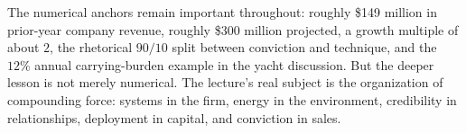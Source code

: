 The numerical anchors remain important throughout: roughly \$149 million in prior-year company revenue, roughly \$300 million projected, a growth multiple of about \(2\), the rhetorical \(90/10\) split between conviction and technique, and the \(12\%\) annual carrying-burden example in the yacht discussion. But the deeper lesson is not merely numerical. The lecture's real subject is the organization of compounding force: systems in the firm, energy in the environment, credibility in relationships, deployment in capital, and conviction in sales.